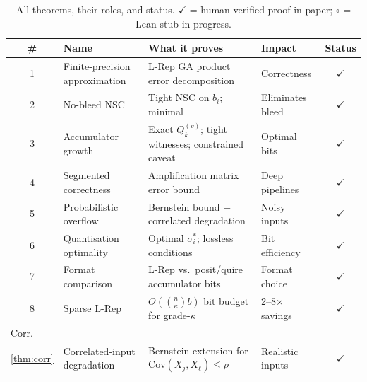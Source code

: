 \documentclass[11pt,a4paper]{article}
\theoremstyle{definition}
\theoremstyle{plain}
\theoremstyle{remark}
\newcommand{\Cov}{\mathrm{Cov}}
\begin{document}
\begin{table}[h]
\centering
\caption{All theorems, their roles, and status.
$\checkmark$ = human-verified proof in paper; $\circ$ = Lean stub in progress.}
\label{tab:all-thms}
\small
\begin{tabular}{cp{3.5cm}p{4cm}p{2.5cm}c}
\toprule
\# & Name & What it proves & Impact & Status \\
\midrule
1 & Finite-precision approximation & L-Rep GA product error decomposition & Correctness & $\checkmark$ \\
2 & No-bleed NSC & Tight NSC on $b_i$; minimal & Eliminates bleed & $\checkmark$ \\
3 & Accumulator growth & Exact $Q_k^{(v)}$; tight witnesses; constrained caveat & Optimal bits & $\checkmark$ \\
4 & Segmented correctness & Amplification matrix error bound & Deep pipelines & $\checkmark$ \\
5 & Probabilistic overflow & Bernstein bound + correlated degradation & Noisy inputs & $\checkmark$ \\
6 & Quantisation optimality & Optimal $\sigma_i^*$; lossless conditions & Bit efficiency & $\checkmark$ \\
7 & Format comparison & L-Rep vs.\ posit/quire accumulator bits & Format choice & $\checkmark$ \\
8 & Sparse L-Rep & $O(\binom{n}{\kappa}b)$ bit budget for grade-$\kappa$ & 2--8$\times$ savings & $\checkmark$ \\
\midrule
\multicolumn{5}{l}{Corr.} \\
\ref{thm:corr} & Correlated-input degradation & Bernstein extension for $\Cov(X_j,X_\ell)\le\rho$ & Realistic inputs & $\checkmark$ \\
\bottomrule
\end{tabular}
\end{table}
\end{document}
